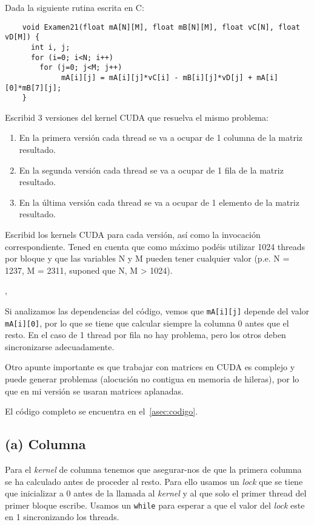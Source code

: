 \begin{pregunta}{Dada la siguiente rutina escrita en C:}
    \begin{verbatim}
    void Examen21(float mA[N][M], float mB[N][M], float vC[N], float vD[M]) {
      int i, j;
      for (i=0; i<N; i++)
        for (j=0; j<M; j++)
             mA[i][j] = mA[i][j]*vC[i] - mB[i][j]*vD[j] + mA[i][0]*mB[7][j];
    }
    \end{verbatim}

    Escribid 3 versiones del kernel CUDA que resuelva el mismo problema:

\begin{enumerate}[label=(\alph*)]
    \item En la primera versión cada thread se va a ocupar de 1 columna de la matriz resultado.
    \item En la segunda versión cada thread se va a ocupar de 1 fila de la matriz resultado.
    \item En la última versión cada thread se va a ocupar de 1 elemento de la matriz resultado.
\end{enumerate}

Escribid los kernels CUDA para cada versión, así como la invocación
correspondiente. Tened en cuenta que como máximo podéis utilizar 1024 threads
por bloque y que las variables N y M pueden tener cualquier valor (p.e. N =
1237, M = 2311, suponed que N, M > 1024).

\vspace{1em} \sep{}
\vspace{3em}

Si analizamos las dependencias del código, vemos que \texttt{mA[i][j]} depende
del valor \texttt{mA[i][0]}, por lo que se tiene que calcular siempre la columna
0 antes que el resto. En el caso de 1 thread por fila no hay problema, pero los
otros deben sincronizarse adecuadamente.

Otro apunte importante es que trabajar con matrices en CUDA es complejo y puede
generar problemas (alocución no contigua en memoria de hileras), por lo que en
mi versión se usaran matrices aplanadas.

El código completo se encuentra en el~\cref{asec:codigo}.

\pagebreak
\subsection*{(a) Columna}

Para el \emph{kernel} de columna tenemos que asegurar-nos de que la primera columna
se ha calculado antes de proceder al resto. Para ello usamos un \emph{lock} que
se tiene que inicializar a 0 antes de la llamada al \emph{kernel} y al que solo el
primer thread del primer bloque escribe. Usamos un \texttt{while} para esperar a que
el valor del \emph{lock} este en 1 sincronizando los threads.


\end{pregunta}
